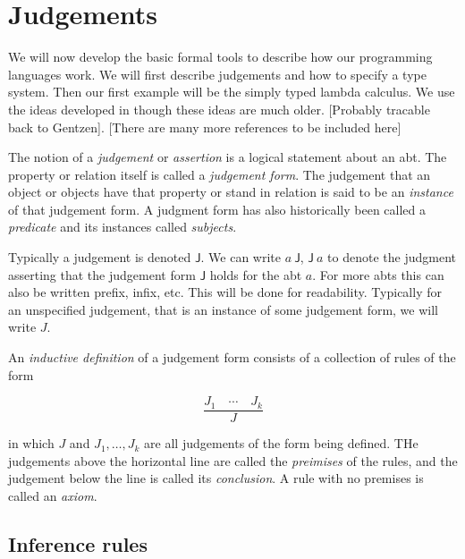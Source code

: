 \section{Judgements}

We will now develop the basic formal tools to describe how our programming languages work.  We will first describe judgements and how to specify a type system. Then our first example will be the simply typed lambda calculus. We use the ideas developed in \cite{harper_2016} though these ideas are much older. [Probably tracable back to Gentzen]. [There are many more references to be included here]

\begin{defin}
    The notion of a \emph{judgement} or \emph{assertion} is a logical statement about an abt. The property or relation itself is called a \emph{judgement form}. The judgement that an object or objects have that property or stand in relation is said to be an \emph{instance} of that judgement form. A judgment form has also historically been called a \emph{predicate} and its instances called \emph{subjects}.
\end{defin}

\begin{remark}
    Typically a judgement is denoted $\mathsf{J}$. We can write $a\ \mathsf{J}$, $\mathsf{J}\ a$ to denote the judgment asserting that the judgement form $\mathsf{J}$ holds for the abt $a$. For more abts this can also be written prefix, infix, etc. This will be done for readability. Typically for an unspecified judgement, that is an instance of some judgement form, we will write $J$.
\end{remark}

\begin{defin}
    An \emph{inductive definition} of a judgement form consists of a collection of rules of the form
    
    $$\frac
        {J_1 \quad \cdots \quad J_k}
        {J}
    $$
    
    in which $J$ and $J_1, \dots , J_k$ are all judgements of the form being defined. THe judgements above the horizontal line are called the \emph{preimises} of the rules, and the judgement below the line is called its \emph{conclusion}. A rule with no premises is called an \emph{axiom}.
\end{defin}

\subsection{Inference rules}

